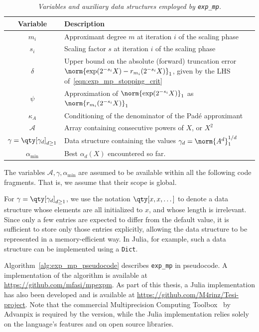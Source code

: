 \begin{table}[hbp]
	\centering 
	\caption{\emph{Variables and auxiliary data structures employed by \emph{\texttt{exp\_mp}}.}}
	\label{tab:exp_mp_variables}
	\begin{tabularx}{\textwidth}{cX}
	\toprule
		\textbf{Variable} & \textbf{Description}\\
	\midrule
		$m_i$ & Approximant degree $m$ at iteration $i$ of the scaling phase \\
		$s_i$ & Scaling factor $s$ at iteration $i$ of the scaling phase \\
		$\delta$ & Upper bound on the absolute (forward) truncation error $\norm{\exp(2^{-s_i}X)-r_{m_i}(2^{-s_i}X)}_1$, given by the LHS of~\eqref{eqn:exp_mp_stopping_crit}\\
		$\psi$ & Approximation of $\norm{\exp(2^{-s_i}X)}_1$ as $\norm{r_{m_i}(2^{-s_i}X)}_1$\\
		$\kappa_A$ & Conditioning of the denominator of the Padé approximant\\
		$\mathcal{A}$ & Array containing consecutive powers of $X$, or $X^2$\\
		$\gamma=\qty[\gamma_d]_{d\ge 1}$ & Data structure containing the values $\gamma_d=\norm{A^d}^{1/d}_1$\\
		$\alpha_{\min}$ & Best $\alpha_d(X)$ encountered so far.\\
	\bottomrule
	\end{tabularx}
\end{table}
The variables $\mathcal{A},\gamma,\alpha_{\min}$ are assumed to be available within all the following code fragments. That is, we assume that their scope is global. 
\begin{notazione*}
	For $\gamma=\qty[\gamma_d]_{d\ge 1}$, we use the notation $\qty[x,x,\dots]$ to denote a data structure whose elements are all initialized to $x$, and whose length is irrelevant. Since only a few entries are expected to differ from the default value, it is sufficient to store only those entries explicitly, allowing the data structure to be represented in a memory-efficient way. In Julia, for example, such a data structure can be implemented using a \texttt{Dict}.
\end{notazione*}

Algorithm~\ref{alg:exp_mp_pseudocode} describes \texttt{exp\_mp} in pseudocode. A \matlab{} implementation of the algorithm is available at \url{https://github.com/mfasi/mpexpm}. As part of this thesis, a Julia implementation has also been developed and is available at \url{https://github.com/M4rinz/Tesi-project}.
Note that the commercial Multiprecision Computing Toolbox~\cite{matlab_mpct} by Advanpix is required by the \matlab{} version, while the Julia implementation relies solely on the language's features and on open source libraries.

